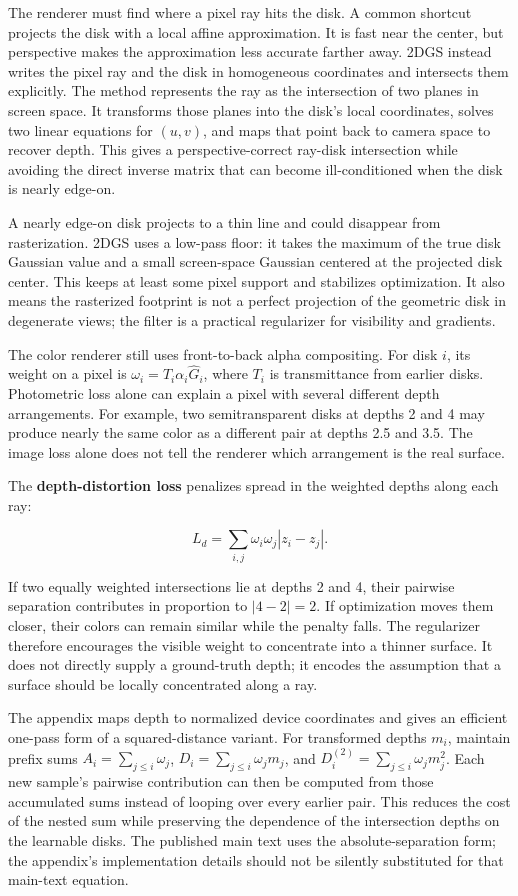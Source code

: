 The renderer must find where a pixel ray hits the disk. A common shortcut projects the disk with a local affine approximation. It is fast near the center, but perspective makes the approximation less accurate farther away. 2DGS instead writes the pixel ray and the disk in homogeneous coordinates and intersects them explicitly. The method represents the ray as the intersection of two planes in screen space. It transforms those planes into the disk's local coordinates, solves two linear equations for \((u,v)\), and maps that point back to camera space to recover depth. This gives a perspective-correct ray-disk intersection while avoiding the direct inverse matrix that can become ill-conditioned when the disk is nearly edge-on.

A nearly edge-on disk projects to a thin line and could disappear from rasterization. 2DGS uses a low-pass floor: it takes the maximum of the true disk Gaussian value and a small screen-space Gaussian centered at the projected disk center. This keeps at least some pixel support and stabilizes optimization. It also means the rasterized footprint is not a perfect projection of the geometric disk in degenerate views; the filter is a practical regularizer for visibility and gradients.

The color renderer still uses front-to-back alpha compositing. For disk \(i\), its weight on a pixel is \(\omega_i=T_i\alpha_i\widehat G_i\), where \(T_i\) is transmittance from earlier disks. Photometric loss alone can explain a pixel with several different depth arrangements. For example, two semitransparent disks at depths 2 and 4 may produce nearly the same color as a different pair at depths 2.5 and 3.5. The image loss alone does not tell the renderer which arrangement is the real surface.

The \textbf{depth-distortion loss} penalizes spread in the weighted depths along each ray:

\[L_d=\sum_{i,j}\omega_i\omega_j|z_i-z_j|.\]

If two equally weighted intersections lie at depths 2 and 4, their pairwise separation contributes in proportion to \(|4-2|=2\). If optimization moves them closer, their colors can remain similar while the penalty falls. The regularizer therefore encourages the visible weight to concentrate into a thinner surface. It does not directly supply a ground-truth depth; it encodes the assumption that a surface should be locally concentrated along a ray.

The appendix maps depth to normalized device coordinates and gives an efficient one-pass form of a squared-distance variant. For transformed depths \(m_i\), maintain prefix sums \(A_i=\sum_{j\le i}\omega_j\), \(D_i=\sum_{j\le i}\omega_jm_j\), and \(D_i^{(2)}=\sum_{j\le i}\omega_jm_j^2\). Each new sample's pairwise contribution can then be computed from those accumulated sums instead of looping over every earlier pair. This reduces the cost of the nested sum while preserving the dependence of the intersection depths on the learnable disks. The published main text uses the absolute-separation form; the appendix's implementation details should not be silently substituted for that main-text equation.

